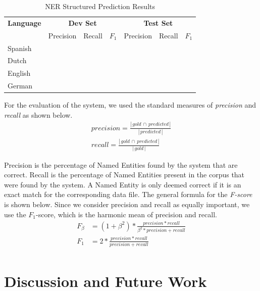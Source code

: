 \documentclass[11pt]{article}
\begin{document}
\begin{table}[t]
\centering
\begin{tabular}{| l | l l l| l l l |}

\hline
\bf Language & \multicolumn{3}{c|}{ \bf Dev Set}&\multicolumn{3}{c|}{ \bf Test Set}\\
             & Precision & Recall & $F_1$ & Precision & Recall & $F_1$ \\ \hline
Spanish &       &          &     &          &               & \\
Dutch  &         &          &     &          &               &   \\
English &        &          &     &          &               &       \\
German &      &          &       &          &             & \\
\hline
\end{tabular}
\caption{NER Structured Prediction Results }
\label{table:Results}
\end{table}

For the evaluation of the system, we used the standard measures of \emph{precision} and \emph{recall} as shown below.
\begin{align*}
     precision =  \frac{  |\,gold\,\cap\,predicted\,| }{ |\,predicted\,| } \\
     recall = \frac{ |\,gold\,\cap\,predicted\,| }{ |\,gold\,| }
\end{align*}

Precision is the percentage of Named Entities found by the system that are correct. Recall is the percentage of Named Entities present in the corpus that were 
found by the system. A Named Entity is only deemed correct if it is an exact match for the corresponding data file. The general formula for the \emph{F-score} 
is shown below. Since we consider precision and recall as equally important, we use the $F_{1}$-score, which is the harmonic mean of precision and recall.
\begin{align*}
  F_{\beta} &=  (1+\beta^2)*\frac{precision *recall}{\beta^2* precision + recall}\\
  F_1       &= 2*\frac{precision *recall}{precision + recall}\\
\end{align*}



\section{Discussion and Future Work}
\end{document}
